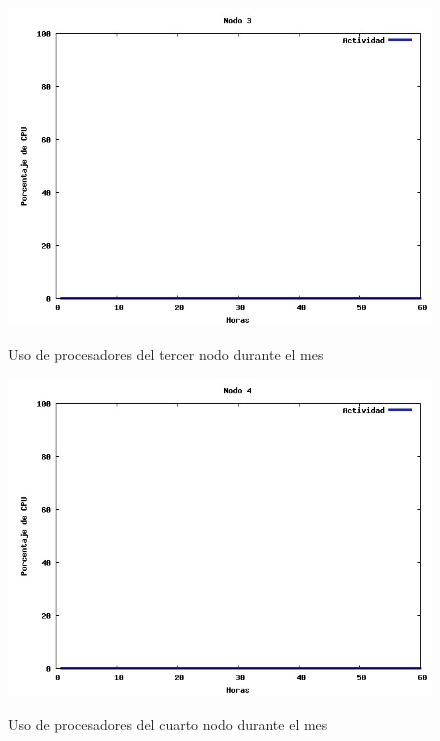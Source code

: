 \documentclass[11pt,a4paper,oneside,openany]{report}
\begin{document}
\begin{figure}[htb]
\centering
\includegraphics[width=0.9\linewidth]{grafico3.jpg}\\
\caption{Uso de procesadores del tercer nodo durante el mes}
\end{figure}

\begin{figure}[htb]
\centering
\includegraphics[width=0.9\linewidth]{grafico4.jpg}\\
\caption{Uso de procesadores del cuarto nodo durante el mes}
\end{figure}
\end{document}
